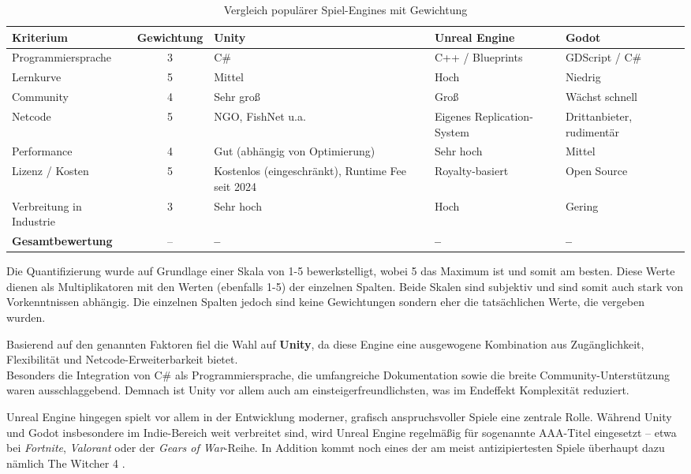 \begin{table}[H]
\centering
\caption{Vergleich populärer Spiel-Engines mit Gewichtung}
{\small
\begin{tabularx}{\textwidth}{|l|c|Y|Y|Y|}
\hline
\textbf{Kriterium} & \textbf{Gewichtung} & \textbf{Unity} & \textbf{Unreal Engine} & \textbf{Godot} \\
\hline
Programmiersprache & 3 & C\# & C++ / Blueprints & GDScript / C\# \\
\hline
Lernkurve & 5 & Mittel & Hoch & Niedrig \\
\hline
Community & 4 & Sehr groß & Groß & Wächst schnell \\
\hline
Netcode & 5 & NGO, FishNet u.a. & Eigenes Replication-System & Drittanbieter, rudimentär \\
\hline
Performance & 4 & Gut (abhängig von Optimierung) & Sehr hoch & Mittel \\
\hline
Lizenz / Kosten & 5 & Kostenlos (eingeschränkt), Runtime Fee seit 2024 \cite{unitylicense} & Royalty-basiert \cite{unrealpricing} & Open Source \cite{godotdoc} \\
\hline
Verbreitung in Industrie & 3 & Sehr hoch & Hoch & Gering \\
\hline
\textbf{Gesamtbewertung} & – & \textbf{–} & \textbf{–} & \textbf{–} \\
\hline
\end{tabularx}
}
\end{table}

Die Quantifizierung wurde auf Grundlage einer Skala von 1-5 bewerkstelligt, wobei 5 das Maximum ist und somit am besten. Diese Werte dienen als Multiplikatoren mit den Werten (ebenfalls 1-5) der einzelnen Spalten. Beide Skalen sind subjektiv und sind somit auch stark von Vorkenntnissen abhängig. 
Die einzelnen Spalten jedoch sind keine Gewichtungen sondern eher die tatsächlichen Werte, die vergeben wurden. 


\newpage
Basierend auf den genannten Faktoren fiel die Wahl auf \textbf{Unity}, da diese Engine eine ausgewogene Kombination aus Zugänglichkeit, Flexibilität und Netcode-Erweiterbarkeit bietet. \\
Besonders die Integration von C\# als Programmiersprache, die umfangreiche Dokumentation sowie die breite Community-Unterstützung waren ausschlaggebend. Demnach ist Unity vor allem auch am einsteigerfreundlichsten, was im Endeffekt Komplexität reduziert.

Unreal Engine hingegen spielt vor allem in der Entwicklung moderner, grafisch anspruchsvoller Spiele eine zentrale Rolle. Während Unity und Godot insbesondere im Indie-Bereich weit verbreitet sind, wird Unreal Engine regelmäßig für sogenannte AAA-Titel eingesetzt -- etwa bei \textit{Fortnite}, \textit{Valorant} oder der \textit{Gears of War}-Reihe. In Addition kommt noch eines der am meist antizipiertesten Spiele überhaupt dazu nämlich The Witcher 4 \cite{witcher-4-demo}. 

